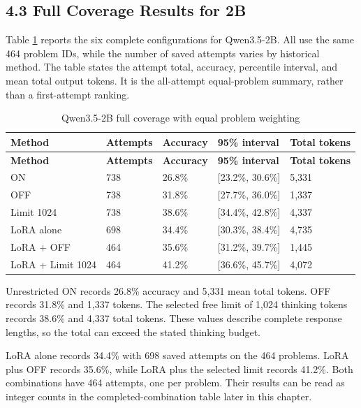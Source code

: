 \documentclass[11pt,letterpaper]{article}
\begin{document}
\subsection*{4.3 Full Coverage Results for 2B}

Table \ref{tab:fullX2b} reports the six complete configurations for Qwen3.5-2B. All use the same 464 problem IDs, while the number of saved attempts varies by historical method. The table states the attempt total, accuracy, percentile interval, and mean total output tokens. It is the all-attempt equal-problem summary, rather than a first-attempt ranking.\par

\begingroup\singlespacing\small\setlength{\tabcolsep}{4pt}
\begin{longtable}{|p{1.130in}|p{1.130in}|p{1.130in}|p{1.130in}|p{1.130in}|}
\caption{Qwen3.5-2B full coverage with equal problem weighting}\label{tab:fullX2b}\\
\hline
\textbf{Method} & \textbf{Attempts} & \textbf{Accuracy} & \textbf{95\% interval} & \textbf{Total tokens}\\\hline
\endfirsthead
\hline
\textbf{Method} & \textbf{Attempts} & \textbf{Accuracy} & \textbf{95\% interval} & \textbf{Total tokens}\\\hline
\endhead
ON & 738 & 26.8\% & [23.2\%, 30.6\%] & 5,331\\\hline
OFF & 738 & 31.8\% & [27.7\%, 36.0\%] & 1,337\\\hline
Limit 1024 & 738 & 38.6\% & [34.4\%, 42.8\%] & 4,337\\\hline
LoRA alone & 698 & 34.4\% & [30.3\%, 38.4\%] & 4,735\\\hline
LoRA + OFF & 464 & 35.6\% & [31.2\%, 39.7\%] & 1,445\\\hline
LoRA + Limit  1024 & 464 & 41.2\% & [36.6\%, 45.7\%] & 4,072\\\hline
\end{longtable}
\endgroup

Unrestricted ON records 26.8\% accuracy and 5,331 mean total tokens. OFF records 31.8\% and 1,337 tokens. The selected free limit of 1,024 thinking tokens records 38.6\% and 4,337 total tokens. These values describe complete response lengths, so the total can exceed the stated thinking budget.\par

LoRA alone records 34.4\% with 698 saved attempts on the 464 problems. LoRA plus OFF records 35.6\%, while LoRA plus the selected limit records 41.2\%. Both combinations have 464 attempts, one per problem. Their results can be read as integer counts in the completed-combination table later in this chapter.\par
\end{document}
